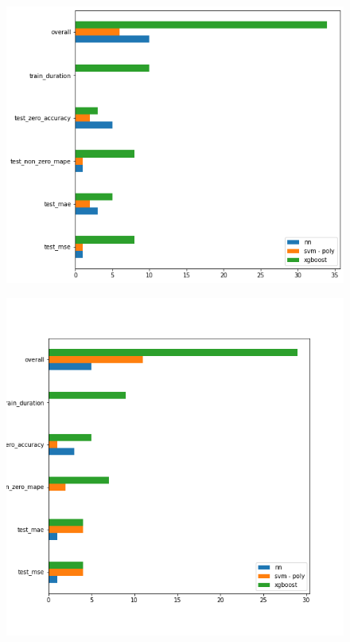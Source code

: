 



\begin{figure}
\centering
\begin{minipage}{.4\textwidth}
  \centering
  \includegraphics[width=\linewidth]{Figures/predictive_analysis/demand_benchmark.png}
  \label{fig:prediction_models_benchmark_demand}
\end{minipage}%
\begin{minipage}{.4\textwidth}
  \centering
  \includegraphics[width=\linewidth]{Figures/predictive_analysis/availability_benchmark.png}
  \label{fig:prediction_models_benchmark_availability}
\end{minipage}
\end{figure}




